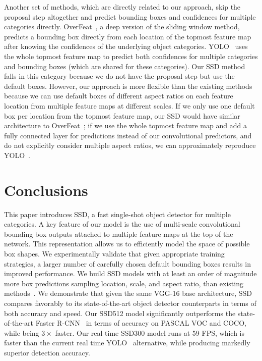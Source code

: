 \documentclass[runningheads]{llncs}
\begin{document}
Another set of methods, which are directly related to our approach, skip the proposal step altogether and predict bounding boxes and confidences for multiple categories directly. OverFeat~\cite{sermanet2013overfeat}, a deep version of the sliding window method, predicts a bounding box directly from each location of the topmost feature map after knowing the confidences of the underlying object categories. YOLO~\cite{redmon2015you} uses the whole topmost feature map to predict both confidences for multiple categories and bounding boxes (which are shared for these categories). Our SSD method falls in this category because we do not have the proposal step but use the default boxes. However, our approach is more flexible than the existing methods because we can use default boxes of different aspect ratios on each feature location from multiple feature maps at different scales. If we only use one default box per location from the topmost feature map, our SSD would have similar architecture to OverFeat~\cite{sermanet2013overfeat}; if we use the whole topmost feature map and add a fully connected layer for predictions instead of our convolutional predictors, and do not explicitly consider multiple aspect ratios, we can approximately reproduce YOLO~\cite{redmon2015you}.

\section{Conclusions}
\label{sec:futurework}
This paper introduces SSD, a fast single-shot object detector for multiple categories. A key feature of our model is the use of multi-scale convolutional bounding box outputs attached to multiple feature maps at the top of the network. This representation allows us to efficiently model the space of possible box shapes. We experimentally validate that given appropriate training strategies, a larger number of carefully chosen default bounding boxes results in improved performance. We build SSD models with at least an order of magnitude more box predictions sampling location, scale, and aspect ratio, than existing methods~\cite{redmon2015you,erhan2014scalable}. We demonstrate that given the same VGG-16 base architecture, SSD compares favorably to its state-of-the-art object detector counterparts in terms of both accuracy and speed.  Our SSD512 model significantly outperforms the state-of-the-art Faster R-CNN~\cite{ren2015faster} in terms of accuracy on PASCAL VOC and COCO, while being $3\times$ faster. Our real time SSD300 model runs at 59 FPS, which is faster than the current real time YOLO~\cite{redmon2015you} alternative, while producing markedly superior detection accuracy.
\end{document}
